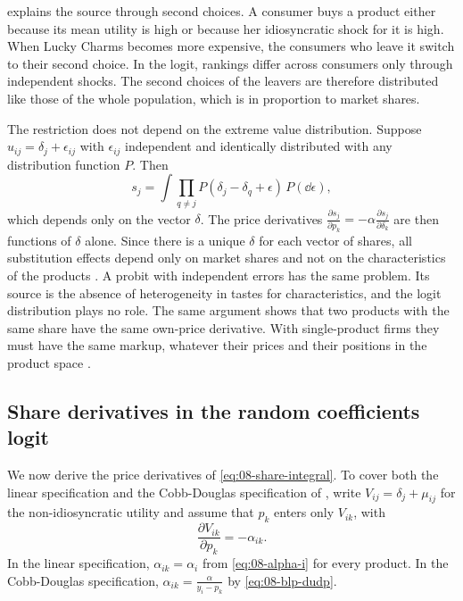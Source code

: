 \citet[p.~523]{Nevo2000a} explains the source through second choices. A consumer buys a product either because
its mean utility is high or because her idiosyncratic shock for it is high. When Lucky Charms becomes more
expensive, the consumers who leave it switch to their second choice. In the logit, rankings differ across
consumers only through independent shocks. The second choices of the leavers are therefore distributed like
those of the whole population, which is in proportion to market shares.

The restriction does not depend on the extreme value distribution. Suppose $u_{ij} = \delta_j + \epsilon_{ij}$
with $\epsilon_{ij}$ independent and identically distributed with any distribution function $P$. Then
\citep[eq.~(2.4)]{BerryLevinsohnPakes1995}
\begin{equation}\label{eq:08-iid-shares}
  s_j = \int \prod_{q \ne j} P(\delta_j - \delta_q + \epsilon)\, P(\dd\epsilon),
\end{equation}
which depends only on the vector $\delta$. The price derivatives $\frac{\partial s_j}{\partial p_k} =
-\alpha\frac{\partial s_j}{\partial \delta_k}$ are then functions of $\delta$ alone. Since there is a unique
$\delta$ for each vector of shares, all substitution effects depend only on market shares and not on the
characteristics of the products \citep[p.~847]{BerryLevinsohnPakes1995}. A probit with independent errors has
the same problem. Its source is the absence of heterogeneity in tastes for characteristics, and the logit
distribution plays no role. The same argument shows that two products with the same share have the same own-price derivative.
With single-product firms they must have the same markup, whatever their prices and their positions in the
product space \citep[p.~847]{BerryLevinsohnPakes1995}.

\subsection{Share derivatives in the random coefficients logit}\label{sec:08-derivatives}

We now derive the price derivatives of \eqref{eq:08-share-integral}. To cover both the linear specification and
the Cobb-Douglas specification of \citet{BerryLevinsohnPakes1995}, write $V_{ij} = \delta_j + \mu_{ij}$ for the
non-idiosyncratic utility and assume that $p_k$ enters only $V_{ik}$, with
\begin{equation}\label{eq:08-alpha-ik}
  \frac{\partial V_{ik}}{\partial p_k} = -\alpha_{ik}.
\end{equation}
In the linear specification, $\alpha_{ik} = \alpha_i$ from \eqref{eq:08-alpha-i} for every product. In the
Cobb-Douglas specification, $\alpha_{ik} = \frac{\alpha}{y_i - p_k}$ by \eqref{eq:08-blp-dudp}.

